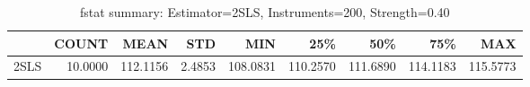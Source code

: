 \begin{table}[ht]
\centering
\caption{fstat summary: Estimator=2SLS, Instruments=200, Strength=0.40}
\begin{tabular}{lrrrrrrrr}
\toprule
 & COUNT & MEAN & STD & MIN & 25\% & 50\% & 75\% & MAX \\
\midrule
2SLS & 10.0000 & 112.1156 & 2.4853 & 108.0831 & 110.2570 & 111.6890 & 114.1183 & 115.5773 \\
\bottomrule
\end{tabular}
\end{table}
